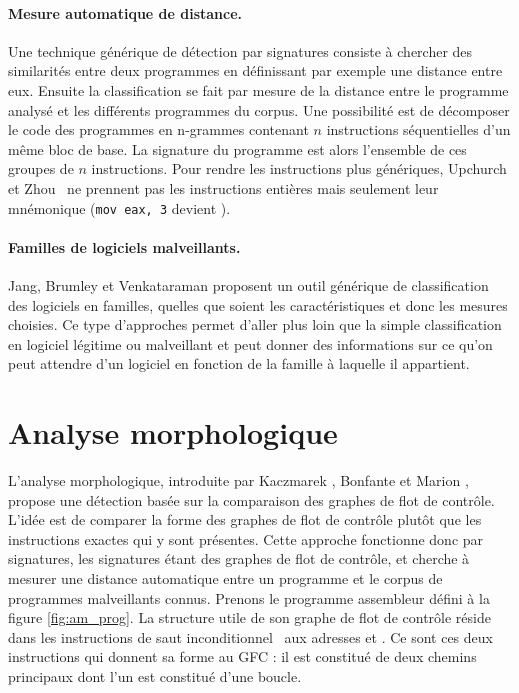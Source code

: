 \paragraph{Mesure automatique de distance.}
Une technique générique de détection par signatures consiste à chercher des similarités entre deux programmes en définissant par exemple une distance entre eux. 
Ensuite la classification se fait par mesure de la distance entre le programme analysé et les différents programmes du corpus.
Une possibilité est de décomposer le code des programmes en n-grammes contenant $n$ instructions séquentielles d'un même bloc de base. La signature du programme est alors l'ensemble de ces groupes de $n$ instructions. Pour rendre les instructions plus génériques, Upchurch et Zhou~\cite{UZ13} ne prennent pas les instructions entières mais seulement leur mnémonique (\texttt{mov eax, 3} devient \mov).

\paragraph{Familles de logiciels malveillants.}
Jang, Brumley et Venkataraman \cite{JBV11} proposent un outil générique de classification des logiciels en familles, quelles que soient les caractéristiques et donc les mesures choisies. Ce type d'approches permet d'aller plus loin que la simple classification en logiciel légitime ou malveillant et peut donner des informations sur ce qu'on peut attendre d'un logiciel en fonction de la famille à laquelle il appartient.

\section{Analyse morphologique}
L'analyse morphologique, introduite par Kaczmarek \cite{Kacz08}, Bonfante et Marion \cite{BKM08}, propose une détection 
basée sur la comparaison des graphes de flot de contrôle. L'idée est de comparer la forme des graphes de flot de contrôle plutôt que les instructions exactes qui y sont présentes.
Cette approche fonctionne donc par signatures, les signatures étant des graphes de flot de contrôle, et cherche à mesurer une distance automatique entre un programme et le corpus de programmes malveillants connus.
Prenons le programme assembleur défini à la figure \ref{fig:am_prog}. La structure utile de son graphe de flot de contrôle réside dans les instructions de saut inconditionnel \jne\ aux adresses  et . Ce sont ces deux instructions qui donnent sa forme au GFC : il est constitué de deux chemins principaux dont l'un est constitué d'une boucle.

